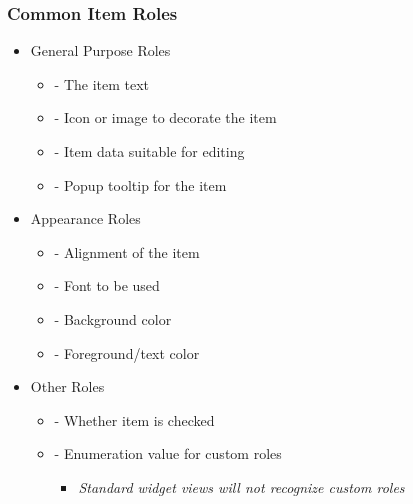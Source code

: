\begin{slide}\frametitle{Common Item Roles}
  \begin{itemize}
  \item General Purpose Roles
    \begin{itemize}
    \item {} - The item text
    \item {} - Icon or image to decorate the item
    \item {} - Item data suitable for editing
    \item {} - Popup tooltip for the item
    \end{itemize}
  \item Appearance Roles
    \begin{itemize}
    \item {} - Alignment of the item
    \item {} - Font to be used
    \item {} - Background color
    \item {} - Foreground/text color
    \end{itemize}
  \item Other Roles
    \begin{itemize}
    \item {} - Whether item is checked
    \item {} - Enumeration value for custom roles
      \begin{itemize}
      \item \textit{Standard widget views will not recognize custom roles}
      \end{itemize}
    \end{itemize}
  \end{itemize}
\end{slide}

